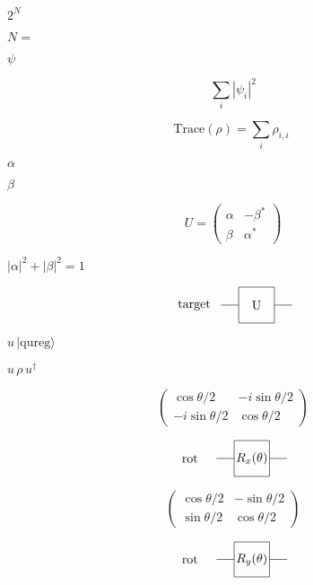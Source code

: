 \documentclass{article}
\begin{document}
$2^{N}$
\pagebreak

$N = $
\pagebreak

$ \psi $
\pagebreak

\[
     \sum\limits_i |\psi_i|^2
\]
\pagebreak

\[
     \text{Trace}(\rho) = \sum\limits_i \rho_{i,i} \;
\]
\pagebreak

$\alpha$
\pagebreak

$\beta$
\pagebreak

\[
U =
\begin{pmatrix}
\alpha & -\beta^* \\
\beta & \alpha^*
\end{pmatrix}
\]
\pagebreak

$|\alpha|^2 + |\beta|^2 = 1$
\pagebreak

\[
             \begin{tikzpicture}[scale=.5]
             \node[draw=none] at (-3.5, 0) {target};

             \draw (-2,0) -- (-1, 0);
             \draw (1, 0) -- (2, 0);
             \draw (-1,-1)--(-1,1)--(1,1)--(1,-1)--cycle;
             \node[draw=none] at (0, 0) {U};
             \end{tikzpicture}
 \]
\pagebreak

$ u \, |\text{qureg}\rangle $
\pagebreak

$ u \, \rho \, u^\dagger $
\pagebreak

\[
\begin{pmatrix}
\cos\theta/2 & -i \sin \theta/2\\
-i \sin \theta/2 & \cos \theta/2
\end{pmatrix}
\]
\pagebreak

\[
             \begin{tikzpicture}[scale=.5]
             \node[draw=none] at (-3.5, 0) {rot};

             \draw (-2,0) -- (-1, 0);
             \draw (1, 0) -- (2, 0);
             \draw (-1,-1)--(-1,1)--(1,1)--(1,-1)--cycle;
             \node[draw=none] at (0, 0) {$R_x(\theta)$};
             \end{tikzpicture}
 \]
\pagebreak

\[
\begin{pmatrix}
\cos\theta/2 & - \sin \theta/2\\
\sin \theta/2 & \cos \theta/2
\end{pmatrix}
\]
\pagebreak

\[
             \begin{tikzpicture}[scale=.5]
             \node[draw=none] at (-3.5, 0) {rot};

             \draw (-2,0) -- (-1, 0);
             \draw (1, 0) -- (2, 0);
             \draw (-1,-1)--(-1,1)--(1,1)--(1,-1)--cycle;
             \node[draw=none] at (0, 0) {$R_y(\theta)$};
             \end{tikzpicture}
 \]
\pagebreak
\end{document}
